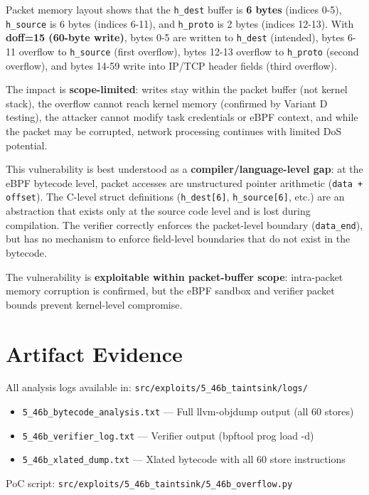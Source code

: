 \vspace{0.2cm}
\noindent
Packet memory layout shows that the \texttt{h\_dest} buffer is \textbf{6 bytes} (indices 0-5), \texttt{h\_source} is 6 bytes (indices 6-11), and \texttt{h\_proto} is 2 bytes (indices 12-13). With \textbf{doff=15 (60-byte write)}, bytes 0-5 are written to \texttt{h\_dest} (intended), bytes 6-11 overflow to \texttt{h\_source} (first overflow), bytes 12-13 overflow to \texttt{h\_proto} (second overflow), and bytes 14-59 write into IP/TCP header fields (third overflow).

\vspace{0.2cm}
\noindent
The impact is \textbf{scope-limited}: writes stay within the packet buffer (not kernel stack), the overflow cannot reach kernel memory (confirmed by Variant D testing), the attacker cannot modify task credentials or eBPF context, and while the packet may be corrupted, network processing continues with limited DoS potential.

\vspace{0.2cm}
\noindent
This vulnerability is best understood as a \textbf{compiler/language-level gap}: at the eBPF bytecode level, packet accesses are unstructured pointer arithmetic (\texttt{data + offset}). The C-level struct definitions (\texttt{h\_dest[6]}, \texttt{h\_source[6]}, etc.) are an abstraction that exists only at the source code level and is lost during compilation. The verifier correctly enforces the packet-level boundary (\texttt{data\_end}), but has no mechanism to enforce field-level boundaries that do not exist in the bytecode.

\vspace{0.2cm}
\noindent
The vulnerability is \textbf{exploitable within packet-buffer scope}: intra-packet memory corruption is confirmed, but the eBPF sandbox and verifier packet bounds prevent kernel-level compromise.


\section{Artifact Evidence}

All analysis logs available in: \texttt{src/exploits/5\_46b\_taintsink/logs/}

\begin{itemize}
  \item \texttt{5\_46b\_bytecode\_analysis.txt} — Full llvm-objdump output (all 60 stores)
  \item \texttt{5\_46b\_verifier\_log.txt} — Verifier output (bpftool prog load -d)
  \item \texttt{5\_46b\_xlated\_dump.txt} — Xlated bytecode with all 60 store instructions
\end{itemize}

\noindent
PoC script: \texttt{src/exploits/5\_46b\_taintsink/5\_46b\_overflow.py}

